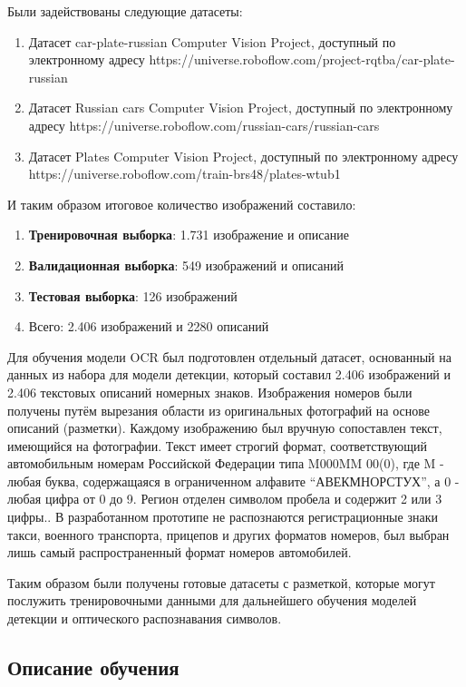 \documentclass[a4paper,12pt]{article}
\begin{document}
Были задействованы следующие датасеты:
\begin{enumerate}
    \item Датасет car-plate-russian Computer Vision Project, доступный по электронному адресу https://universe.roboflow.com/project-rqtba/car-plate-russian
    \item Датасет Russian cars Computer Vision Project, доступный по электронному адресу https://universe.roboflow.com/russian-cars/russian-cars
    \item Датасет Plates Computer Vision Project, доступный по электронному адресу https://universe.roboflow.com/train-brs48/plates-wtub1
\end{enumerate}

И таким образом итоговое количество изображений составило:
\begin{enumerate}
    \item \textbf{Тренировочная выборка}: 1.731 изображение и описание
    \item \textbf{Валидационная выборка}: 549 изображений и описаний
    \item \textbf{Тестовая выборка}: 126 изображений
    \item Всего: 2.406 изображений и 2280 описаний
\end{enumerate}

Для обучения модели OCR был подготовлен отдельный датасет, основанный на данных из набора для модели детекции, который составил 2.406 изображений и 2.406 текстовых описаний номерных знаков.
Изображения номеров были получены путём вырезания области из оригинальных фотографий на основе описаний (разметки). Каждому изображению был вручную сопоставлен текст, имеющийся на фотографии. Текст имеет строгий формат, соответствующий автомобильным номерам Российской Федерации типа M000MM 00(0), где M - любая буква, содержащаяся в ограниченном алфавите ``АВЕКМНОРСТУХ'', а 0 - любая цифра от 0 до 9. Регион отделен символом пробела и содержит 2 или 3 цифры.\cite{plate_format}. В разработанном прототипе не распознаются регистрационные знаки такси, военного транспорта, прицепов и других форматов номеров, был выбран лишь самый распространенный формат номеров автомобилей.

Таким образом были получены готовые датасеты с разметкой, которые могут послужить тренировочными данными для дальнейшего обучения моделей детекции и оптического распознавания символов.

\subsection{Описание обучения}
\end{document}
